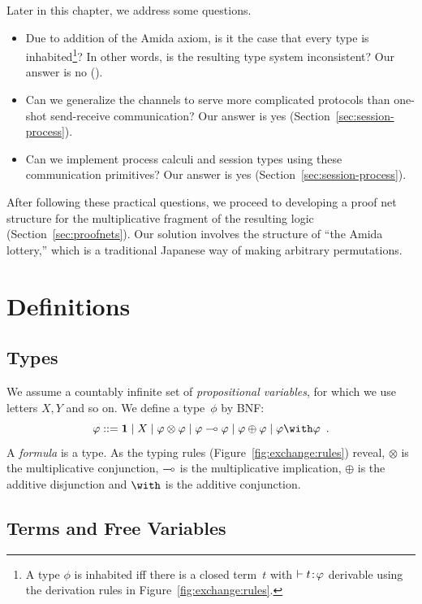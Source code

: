 Later in this chapter, we address some questions.
\begin{itemize}
 \item Due to addition of the Amida axiom, is it the case that
       every type is inhabited\footnote{A type $\phi$ is inhabited iff
       there is a closed term~$t$ with $\vdash {t} \mathord{\colon\kern -2pt}{\varphi}$ derivable
       using the derivation rules in Figure~\ref{fig:exchange:rules}.}?
       In other words,
       is the resulting type system inconsistent?  Our answer is no ().
 \item Can we generalize the channels to serve more complicated
       protocols than one-shot send-receive communication?  Our answer is
       yes (Section~\ref{sec:session-process}).
 \item Can we implement process calculi and session types using these communication
       primitives?  Our answer is yes (Section~\ref{sec:session-process}).
\end{itemize}

After following these practical questions,
we proceed to developing a proof net structure for the multiplicative
fragment of the resulting logic
(Section~\ref{sec:proofnets}).
Our solution involves the structure of
``the Amida lottery,'' which is a traditional
Japanese way of making arbitrary permutations.

\section{Definitions}

\subsection{Types}
We assume a countably infinite set of \textit{propositional
variables}, for which
we use letters $X,Y$ and so on.
We define a type~$\phi$ by BNF:
\[
 \phi::=\one \mid X \mid \phi\otimes\phi\mid \phi\limp\phi\mid
 \phi\oplus\phi\mid \phi\with\phi\enspace.
\]
A \textit{formula} is a type.
As the typing rules (Figure~\ref{fig:exchange:rules}) reveal,
$\otimes$ is the multiplicative conjunction,
$\multimap$ is the multiplicative implication,
$\oplus$ is the additive disjunction and
$\with$ is the additive conjunction.

\subsection{Terms and Free Variables}

